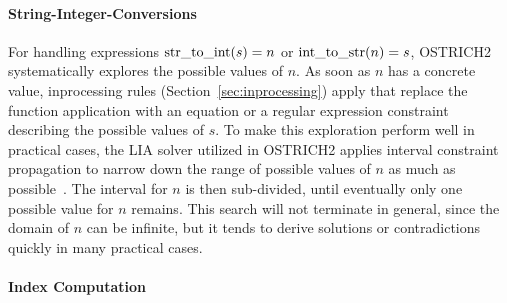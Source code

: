\paragraph{String-Integer-Conversions}
For handling expressions $\operatorname{str\_to\_int}(s) = n$ or
$\operatorname{int\_to\_str}(n) = s$, OSTRICH2 systematically explores the possible
values of $n$. As soon as $n$ has a concrete value, inprocessing rules
(Section~\ref{sec:inprocessing}) apply that replace the function
application with an equation or a regular expression constraint
describing the possible values of $s$. To make this exploration
perform well in practical cases, the LIA solver utilized in OSTRICH2
applies interval constraint propagation to narrow down the range of
possible values of $n$ as much as
possible~\cite{DBLP:journals/fmsd/BackemanRZ21}. The interval for $n$
is then sub-divided, until eventually only one possible value for $n$
remains. This search will not terminate in general, since the domain
of $n$ can be infinite, but it tends to derive solutions or
contradictions quickly in many practical cases.

\paragraph{Index Computation}


